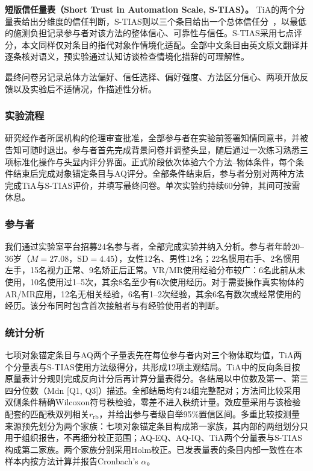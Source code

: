 \documentclass[review]{vgtc}
\begin{document}
\textbf{短版信任量表（Short Trust in Automation Scale, S-TIAS）。}
TiA的两个分量表给出分维度的信任判断，S-TIAS则以三个条目给出一个总体信任分~\cite{mcgrath2025stias}，以最低的施测负担记录参与者对该方法的整体信心、可靠性与信任。S-TIAS采用七点评分，本文同样仅对条目的指代对象作情境化适配。全部中文条目由英文原文翻译并逐条核对语义，预实验通过认知访谈检查情境化措辞的可理解性。

最终问卷另记录总体方法偏好、信任选择、偏好强度、方法区分信心、两项开放反馈以及实验后不适情况，作描述性分析。

\subsubsection{实验流程}

研究经作者所属机构的伦理审查批准，全部参与者在实验前签署知情同意书，并被告知可随时退出。参与者首先完成背景问卷并调整头显，随后通过一次练习熟悉三项标准化操作与头显内评分界面。正式阶段依次体验六个方法--物体条件，每个条件结束后完成对象锚定条目与AQ评分。全部条件结束后，参与者分别对两种方法完成TiA与S-TIAS评价，并填写最终问卷。单次实验约持续60分钟，其间可按需休息。

\subsubsection{参与者}

我们通过实验室平台招募24名参与者，全部完成实验并纳入分析。参与者年龄20--36岁（$M=27.08$，$\mathrm{SD}=4.45$），女性12名、男性12名；22名惯用右手、2名惯用左手，15名视力正常、9名矫正后正常。VR/MR使用经验分布较广：6名此前从未使用，10名使用过1--5次，其余8名至少有6次使用经历。对于需要操作真实物体的AR/MR应用，12名无相关经验，6名有1--2次经验，其余6名有数次或经常使用的经历。该分布同时包含首次接触者与有经验使用者的判断。

\subsubsection{统计分析}

七项对象锚定条目与AQ两个子量表先在每位参与者内对三个物体取均值，TiA两个分量表与S-TIAS使用方法级得分，共形成12项主观结局。TiA中的反向条目按原量表计分规则完成反向计分后再计算分量表得分。各结局以中位数及第一、第三四分位数（Mdn [Q1, Q3]）描述。全部结局均有24组完整配对；方法间比较采用双侧条件精确Wilcoxon符号秩检验，零差不进入秩统计量。效应量采用与该检验配套的匹配秩双列相关$r_{\mathrm{rb}}$，并给出参与者级自举95\%置信区间。多重比较按测量来源预先划分为两个家族：七项对象锚定条目构成第一家族，其内部的两组划分只用于组织报告，不再细分校正范围；AQ-EQ、AQ-IQ、TiA两个分量表与S-TIAS构成第二家族。两个家族分别采用Holm校正。已发表量表的条目内部一致性在本样本内按方法计算并报告Cronbach's $\alpha$。
\end{document}
